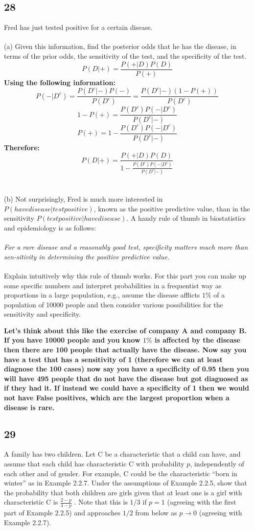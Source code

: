 \documentclass{article}
\begin{document}
\subsection{28}
Fred has just tested positive for a certain disease.\\\\
(a) Given this information, find the posterior odds that he has the disease, in terms of the prior odds, the sensitivity of the test, and the specificity of the test.
$$P(D|+)=\frac{P(+|D)P(D)}{P(+)}$$
\textbf{Using the following information:}
$$P(-|D^c)=\frac{P(D^c|-)P(-)}{P(D^c)}=\frac{P(D^c|-)(1-P(+))}{P(D^c)}$$
$$1-P(+)=\frac{P(D^c)P(-|D^c)}{P(D^c|-)}$$
$$P(+)=1-\frac{P(D^c)P(-|D^c)}{P(D^c|-)}$$
\textbf{Therefore:}
$$P(D|+)=\frac{P(+|D)P(D)}{1-\frac{P(D^c)P(-|D^c)}{P(D^c|-)}}$$
\\\\
(b) Not surprisingly, Fred is much more interested in $P(have disease|test positive)$, known as the positive predictive value, than in the sensitivity $P (test positive|have disease)$. A handy rule of thumb in biostatistics and epidemiology is as follows:\\\\
\textit{For a rare disease and a reasonably good test, specificity matters much more than sen-sitivity in determining the positive predictive value.}\\\\
Explain intuitively why this rule of thumb works. For this part you can make up some specific numbers and interpret probabilities in a frequentist way as proportions in a large population, e.g., assume the disease afflicts $1\%$ of a population of 10000 people and then consider various possibilities for the sensitivity and specificity.

\textbf{Let's think about this like the exercise of company A and company B. If you have 10000 people and you know $1\%$ is affected by the disease then there are 100 people that actually have the disease. Now say you have a test that has a sensitivity of 1 (therefore we can at least diagnose the 100 cases) now say you have a specificity of 0.95 then you will have 495 people that do not have the disease but got diagnosed as if they had it. If instead we could have a specificity of 1 then we would not have False positives, which are the largest proportion when a disease is rare. }

\subsection{29}
A family has two children. Let C be a characteristic that a child can have, and assume
that each child has characteristic C with probability $p$, independently of each other and
of gender. For example, C could be the characteristic “born in winter” as in Example 2.2.7. Under the assumptions of Example 2.2.5, show that the probability that both
children are girls given that at least one is a girl with characteristic C is $\frac{2-p}{4-p}$ . Note that 
this is $1/3$ if $p = 1$ (agreeing with the first part of Example 2.2.5) and approaches $1/2$ from below as $p \rightarrow 0$ (agreeing with Example 2.2.7).
\end{document}
